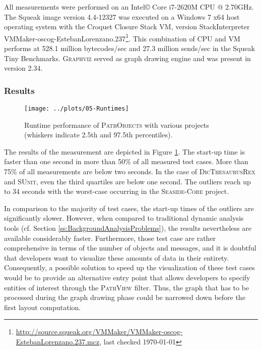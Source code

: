 All measurements were performed on an Intel\copyright{} Core\texttrademark{}  i7-2620M CPU @ 2.70GHz.
The Squeak image version 4.4-12327 was executed on a Windows 7 x64 host operating system with the Croquet Closure Stack VM, version StackInterpreter VMMaker-oscog-EstebanLorenzano.237\footnote{\url{http://source.squeak.org/VMMaker/VMMaker-oscog-EstebanLorenzano.237.mcz}, last checked \today}. 
This combination of CPU and VM performs at 528.1 million bytecodes/sec and 27.3 million sends/sec in the Squeak Tiny Benchmarks. \textsc{Graphviz} served as graph drawing engine and was present in version 2.34.

\subsubsection{Results}

\begin{figure}[tb!]
	\centering
	\texttt{[image: ../plots/05-Runtimes]}
	\caption[Runtime Performance of \textsc{PathObjects}]{Runtime performance of \textsc{PathObjects} with various projects (whiskers indicate 2.5th and 97.5th percentiles).}
	\label{f:DiscussionRuntime}
\end{figure}

The results of the measurement are depicted in Figure \ref{f:DiscussionRuntime}.
The start-up time is faster than one second in more than 50\% of all measured test cases.
More than 75\% of all measurements are below two seconds.
In the case of \textsc{DicThesaurusRex} and \textsc{SUnit}, even the third quartiles are below one second.
The outliers reach up to 34 seconds with the worst-case occurring in the \textsc{Seaside-Core} project.

In comparison to the majority of test cases, the start-up times of the outliers are significantly slower.
However, when compared to traditional dynamic analysis tools (cf. Section \ref{ss:BackgroundAnalysisProblems}), the results nevertheless are available considerably faster.
Furthermore, those test case are rather comprehensive in terms of the number of objects and messages, and it is doubtful that developers want to visualize these amounts of data in their entirety.
Consequently, a possible solution to speed up the visualization of these test cases would be to provide an alternative entry point that allows developers to specify entities of interest through the \textsc{PathView} filter.
Thus, the graph that has to be processed during the graph drawing phase could be narrowed down before the first layout computation.

